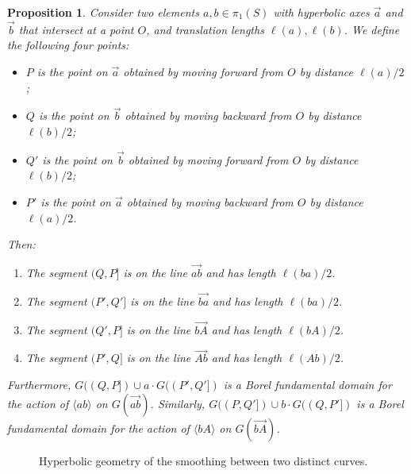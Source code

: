 \documentclass[11pt]{amsart}
\newcommand{\ora}[1]{\overrightarrow{#1}}
\newcommand*{\svgfignormal}[1]{\fontsize{9pt}{9pt}\selectfont}
\numberwithin{equation}{section}
\numberwithin{figure}{section}
\newtheorem{proposition}[theorem]{Proposition}
\theoremstyle{definition}
\theoremstyle{plain}
\begin{document}
\begin{proposition}
Consider two elements $a, b \in \pi_1(S)$ with hyperbolic axes $\ora{a}$ and $\ora{b}$ that intersect at a point $O$, and translation lengths $\ell(a),\ell(b)$.
We define the following four points:

\begin{itemize} \item $P$ is the point on $\ora{a}$ obtained by moving forward from $O$ by distance $\ell(a)/2$;
\item $Q$ is the point on $\ora{b}$ obtained by moving backward from $O$ by distance $\ell(b)/2$;
\item $Q'$ is the point on $\ora{b}$ obtained by moving forward from $O$ by distance $\ell(b)/2$;
\item $P'$ is the point on $\ora{a}$ obtained by moving backward from $O$ by distance $\ell(a)/2$.
\end{itemize}
Then:
\begin{enumerate}
\item The segment $(Q,P]$ is on the line $\ora{ab}$ and has length $\ell(ba)/2$.
\item The segment $(P',Q']$ is on the line $\ora{ba}$ and has length $\ell(ba)/2$.
\item The segment $(Q',P]$ is on the line $\ora{bA}$ and has length $\ell(bA)/2$.
\item The segment $(P',Q]$ is on the line $\ora{Ab}$ and has length $\ell(Ab)/2$.
\end{enumerate}
Furthermore, $G((Q,P])\cup a\cdot
G((P',Q'])$ is a Borel fundamental domain for the
action of $\langle ab \rangle$ on $G(\ora{ab})$.
Similarly, $G((P,Q']) \cup b \cdot G((Q,P'])$ is a Borel fundamental domain for
 the action of $\langle bA\rangle$ on $G(\ora{bA})$.
\label{prop:keygeometry}
\end{proposition}

  \begin{figure}
\centering{
\svgfignormal{smoothing_1}}
\caption{Hyperbolic geometry of the smoothing between two distinct curves.}
\label{fig:smoothing_1}
\end{figure}
\end{document}
